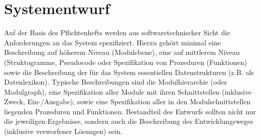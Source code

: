 \chapter{Systementwurf}\label{chp:systementwurf}
Auf der Basis des Pflichtenhefts werden aus softwaretechnischer Sicht die Anforderungen an das System spezifiziert. Hierzu gehört minimal eine Beschreibung auf höherem Niveau (Modulebene), eine auf mittlerem Niveau (Struktogramme, Pseudocode oder Spezifikation von Prozeduren (Funktionen) sowie die Beschreibung der für das System essentiellen Datenstrukturen (z.B. als Datenlexikon). Typische Beschreibungen sind die Modulhierarchie (oder Modulgraph), eine Spezifikation aller Module mit ihren Schnittstellen (inklusive Zweck, Ein-/Ausgabe), sowie eine Spezifikation aller in den Modulschnittstellen liegenden Prozeduren und Funktionen.
Bestandteil des Entwurfs sollten nicht nur die jeweiligen Ergebnisse, sondern auch die Beschreibung des Entwicklungsweges (inklusive verworfener Lösungen) sein.